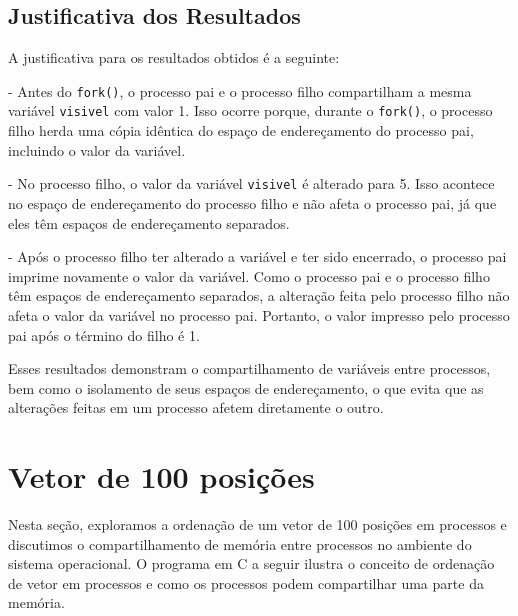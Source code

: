 \documentclass[
	12pt,				%
	openright,			%
	oneside,			%
	a4paper,			%
	chapter=TITLE,		%
	english,			%
	french,				%
	spanish,			%
	brazil				%
	]{abntex2}
\theoremstyle{definition}
\begin{document}
\subsection{Justificativa dos Resultados}

A justificativa para os resultados obtidos é a seguinte:

- Antes do \texttt{fork()}, o processo pai e o processo filho compartilham a mesma variável \texttt{visivel} com valor 1. Isso ocorre porque, durante o \texttt{fork()}, o processo filho herda uma cópia idêntica do espaço de endereçamento do processo pai, incluindo o valor da variável.

- No processo filho, o valor da variável \texttt{visivel} é alterado para 5. Isso acontece no espaço de endereçamento do processo filho e não afeta o processo pai, já que eles têm espaços de endereçamento separados.

- Após o processo filho ter alterado a variável e ter sido encerrado, o processo pai imprime novamente o valor da variável. Como o processo pai e o processo filho têm espaços de endereçamento separados, a alteração feita pelo processo filho não afeta o valor da variável no processo pai. Portanto, o valor impresso pelo processo pai após o término do filho é 1.

Esses resultados demonstram o compartilhamento de variáveis entre processos, bem como o isolamento de seus espaços de endereçamento, o que evita que as alterações feitas em um processo afetem diretamente o outro.


\section{Vetor de 100 posições}


Nesta seção, exploramos a ordenação de um vetor de 100 posições em processos e discutimos o compartilhamento de memória entre processos no ambiente do sistema operacional. O programa em C a seguir ilustra o conceito de ordenação de vetor em processos e como os processos podem compartilhar uma parte da memória.
\end{document}
